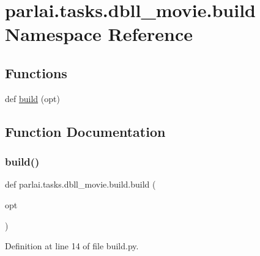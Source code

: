 \hypertarget{namespaceparlai_1_1tasks_1_1dbll__movie_1_1build}{}\section{parlai.\+tasks.\+dbll\+\_\+movie.\+build Namespace Reference}
\label{namespaceparlai_1_1tasks_1_1dbll__movie_1_1build}
\subsection*{Functions}
\begin{DoxyCompactItemize}
\item 
def \hyperlink{namespaceparlai_1_1tasks_1_1dbll__movie_1_1build_a5e884d505c1311a6afaaf8a587e4708f}{build} (opt)
\end{DoxyCompactItemize}


\subsection{Function Documentation}
\mbox{\label{namespaceparlai_1_1tasks_1_1dbll__movie_1_1build_a5e884d505c1311a6afaaf8a587e4708f}} 
\subsubsection{\texorpdfstring{build()}{build()}}
{\footnotesize\ttfamily def parlai.\+tasks.\+dbll\+\_\+movie.\+build.\+build (\begin{DoxyParamCaption}\item[{}]{opt }\end{DoxyParamCaption})}



Definition at line 14 of file build.\+py.

